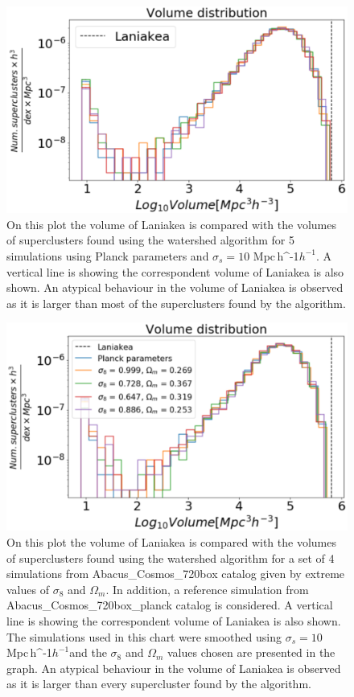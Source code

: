 \documentclass[usenatbib]{mnras}
\newcommand{\Mpch}{\,{\rm Mpc}\,\ifmmode h^{-1}\else $h^{-1}$\fi}
\begin{document}
\begin{figure}
    \centering
    \includegraphics[width=345pt]{vol_planck.pdf}
    \caption{On this plot the volume of Laniakea is compared with the volumes of superclusters found using the watershed algorithm for 5 simulations using Planck parameters and $\sigma_s = 10$\,\Mpch. A vertical line is showing the correspondent volume of Laniakea is also shown. An atypical behaviour in the volume of Laniakea is observed as it is larger than most of the superclusters found by the algorithm. } 
    \label{fig:planck}
\end{figure}


\begin{figure}
    \centering
    \includegraphics[width=345pt]{vol_different_simulations.pdf}
    \caption{On this plot the volume of Laniakea is compared with the volumes of superclusters found using the watershed algorithm for a set of 4 simulations from Abacus\_Cosmos\_720box catalog given by extreme values of $\sigma_8$ and $\Omega_m$. In addition, a reference simulation from Abacus\_Cosmos\_720box\_planck catalog is considered. A vertical line is showing the correspondent volume of Laniakea is also shown. The simulations used in this chart were smoothed using $\sigma_s = 10$\,\Mpch and the $\sigma_8$ and $\Omega_m$ values chosen are presented in the graph. An atypical behaviour in the volume of Laniakea is observed as it is larger than every supercluster found by the algorithm.} 
    \label{fig:diferentes}
\end{figure}
\end{document}
